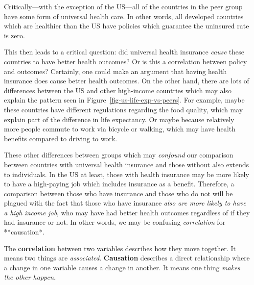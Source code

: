 \documentclass[
  letterpaper,
  DIV=11,
  numbers=noendperiod]{scrreprt}
\begin{document}
Critically---with the exception of the US---all of the countries in the
peer group have some form of universal health care. In other words, all
developed countries which are healthier than the US have policies which
guarantee the uninsured rate is zero.

This then leads to a critical question: did universal health insurance
\emph{cause} these countries to have better health outcomes? Or is this
a correlation between policy and outcomes? Certainly, one could make an
argument that having health insurance does cause better health outcomes.
On the other hand, there are lots of differences between the US and
other high-income countries which may also explain the pattern seen in
Figure~\ref{fig-us-life-exp-vs-peers}. For example, maybe these
countries have different regulations regarding the food quality, which
may explain part of the difference in life expectancy. Or maybe because
relatively more people commute to work via bicycle or walking, which may
have health benefits compared to driving to work.

These other differences between groups which may \emph{confound} our
comparison between countries with universal health insurance and those
without also extends to individuals. In the US at least, those with
health insurance may be more likely to have a high-paying job which
includes insurance as a benefit. Therefore, a comparison between those
who have insurance and those who do not will be plagued with the fact
that those who have insurance \emph{also are more likely to have a high
income job}, who may have had better health outcomes regardless of if
they had insurance or not. In other words, we may be confusing
\emph{correlation} for **causation*.

\begin{tcolorbox}[enhanced jigsaw, arc=.35mm, bottomrule=.15mm, bottomtitle=1mm, breakable, colback=white, colbacktitle=quarto-callout-note-color!10!white, colframe=quarto-callout-note-color-frame, coltitle=black, left=2mm, leftrule=.75mm, opacityback=0, opacitybacktitle=0.6, rightrule=.15mm, title=\textcolor{quarto-callout-note-color}{\faInfo}\hspace{0.5em}{Correlation vs.~Causation}, titlerule=0mm, toprule=.15mm, toptitle=1mm]

The \textbf{correlation} between two variables describes how they move
together. It means two things are \emph{associated}. \textbf{Causation}
describes a direct relationship where a change in one variable causes a
change in another. It means one thing \emph{makes the other happen.}

\end{tcolorbox}
\end{document}
